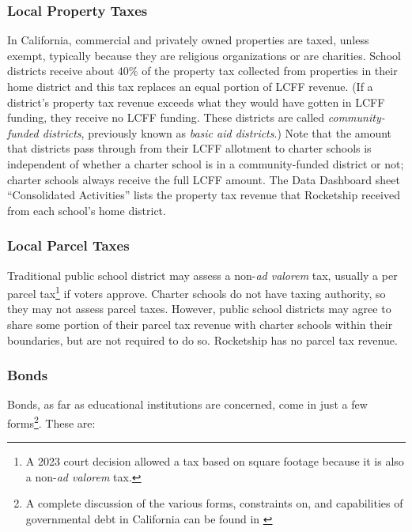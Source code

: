 \subsubsection{Local Property Taxes}%
\label{sec:property-taxes}\indent%

In California, commercial and privately owned properties are taxed, unless exempt, typically because they are religious organizations or are charities. School districts receive about 40\% of the property tax collected from properties in their home district and this tax replaces an equal portion of LCFF revenue. (If a district's property tax revenue exceeds what they would have gotten in LCFF funding, they receive no LCFF funding. These districts are called \textit{community-funded districts}, previously known as \textit{basic aid districts}.) Note that the amount that districts pass through from their LCFF allotment to charter schools is independent of whether a charter school is in a community-funded district or not; charter schools always receive the full LCFF amount. The Data Dashboard sheet ``Consolidated Activities'' lists the property tax revenue that Rocketship received from each school's home district.

\subsubsection{Local Parcel Taxes}%
\label{sec:parcel-taxes}\indent%

Traditional public school district may assess a non-\textit{ad valorem} tax, usually a per parcel tax\footnote{A 2023 court decision allowed a tax based on square footage because it is also a non-\textit{ad valorem} tax.} if voters approve. Charter schools do not have taxing authority, so they may not assess parcel taxes. However, public school districts may agree to share some portion of their parcel tax revenue with charter schools within their boundaries, but are not required to do so. Rocketship has no parcel tax revenue.

\subsubsection{Bonds}%
\label{sec:bonds}\indent%

Bonds, as far as educational institutions are concerned, come in just a few forms\footnote{A complete discussion of the various forms, constraints on, and capabilities of governmental debt in California can be found in  \parencite{CDIAC2022}}. These are:

